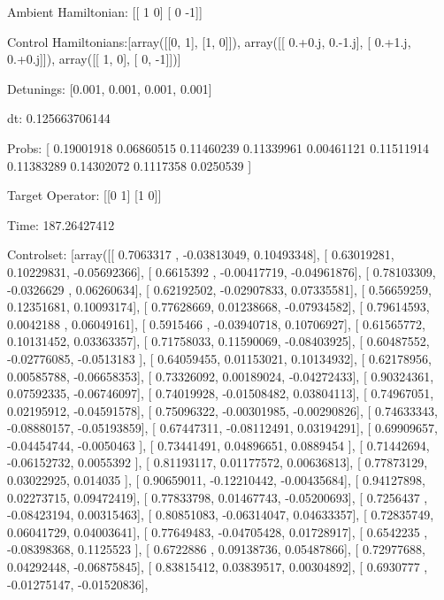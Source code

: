 \documentclass{article}
\begin{document}
    

\newpage

Ambient Hamiltonian: [[ 1  0]
 [ 0 -1]]

Control Hamiltonians:[array([[0, 1],
       [1, 0]]), array([[ 0.+0.j,  0.-1.j],
       [ 0.+1.j,  0.+0.j]]), array([[ 1,  0],
       [ 0, -1]])]

Detunings: [0.001, 0.001, 0.001, 0.001]

 dt: 0.125663706144

Probs: [ 0.19001918  0.06860515  0.11460239  0.11339961  0.00461121  0.11511914
  0.11383289  0.14302072  0.1117358   0.0250539 ]

Target Operator: [[0 1]
 [1 0]]

Time: 187.26427412

Controlset: [array([[ 0.7063317 , -0.03813049,  0.10493348],
       [ 0.63019281,  0.10229831, -0.05692366],
       [ 0.6615392 , -0.00417719, -0.04961876],
       [ 0.78103309, -0.0326629 ,  0.06260634],
       [ 0.62192502, -0.02907833,  0.07335581],
       [ 0.56659259,  0.12351681,  0.10093174],
       [ 0.77628669,  0.01238668, -0.07934582],
       [ 0.79614593,  0.0042188 ,  0.06049161],
       [ 0.5915466 , -0.03940718,  0.10706927],
       [ 0.61565772,  0.10131452,  0.03363357],
       [ 0.71758033,  0.11590069, -0.08403925],
       [ 0.60487552, -0.02776085, -0.0513183 ],
       [ 0.64059455,  0.01153021,  0.10134932],
       [ 0.62178956,  0.00585788, -0.06658353],
       [ 0.73326092,  0.00189024, -0.04272433],
       [ 0.90324361,  0.07592335, -0.06746097],
       [ 0.74019928, -0.01508482,  0.03804113],
       [ 0.74967051,  0.02195912, -0.04591578],
       [ 0.75096322, -0.00301985, -0.00290826],
       [ 0.74633343, -0.08880157, -0.05193859],
       [ 0.67447311, -0.08112491,  0.03194291],
       [ 0.69909657, -0.04454744, -0.0050463 ],
       [ 0.73441491,  0.04896651,  0.0889454 ],
       [ 0.71442694, -0.06152732,  0.0055392 ],
       [ 0.81193117,  0.01177572,  0.00636813],
       [ 0.77873129,  0.03022925,  0.014035  ],
       [ 0.90659011, -0.12210442, -0.00435684],
       [ 0.94127898,  0.02273715,  0.09472419],
       [ 0.77833798,  0.01467743, -0.05200693],
       [ 0.7256437 , -0.08423194,  0.00315463],
       [ 0.80851083, -0.06314047,  0.04633357],
       [ 0.72835749,  0.06041729,  0.04003641],
       [ 0.77649483, -0.04705428,  0.01728917],
       [ 0.6542235 , -0.08398368,  0.1125523 ],
       [ 0.6722886 ,  0.09138736,  0.05487866],
       [ 0.72977688,  0.04292448, -0.06875845],
       [ 0.83815412,  0.03839517,  0.00304892],
       [ 0.6930777 , -0.01275147, -0.01520836],
\end{document}
